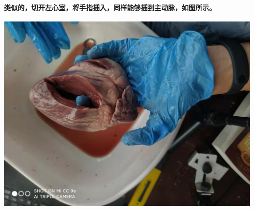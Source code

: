 \documentclass[final,11pt,oneside,UTF8]{report}
\begin{document}
\paragraph{
    类似的，切开左心室，将手指插入，同样能够插到主动脉，如图所示。
}
\begin{center}
    \includegraphics[scale=0.1,angle=0]{photos/stickL.jpg}
\end{center}
\end{document}
